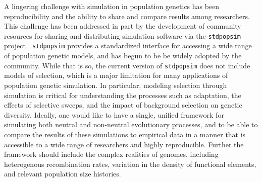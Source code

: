 \documentclass[hidelinks]{article}
\newcommand{\stdpopsim}{\texttt{stdpopsim}\xspace}
\begin{document}
    A lingering challenge with simulation in population genetics has been
    reproducibility and the ability to share and compare results among 
    researchers. This challenge has been addressed in part by the development
    of community resources for sharing and distributing simulation software
    via the \stdpopsim project \citep{adrion2020community}. \stdpopsim
    provides a standardized interface for accessing a wide range of
    population genetic models, and has begun to be be widely adopted by the community.
    While that is so, the current version of \stdpopsim does not include
    models of selection, which is a major limitation for many applications
    of population genetic simulation. In particular, modeling selection
    through simulation is critical for understanding the processes such
    as adaptation, the effects of selective sweeps, and the impact of
    background selection on genetic diversity. Ideally, one would like
    to have a single, unified framework for simulating both neutral and
    non-neutral evolutionary processes, and to be able to compare the
    results of these simulations to empirical data in a manner that is
    accessible to a wide range of researchers and highly reproducible. 
    Further the framework should include the complex realities of 
    genomes, including heterogenous recombination rates, 
    variation in the density of functional elements, and relevant
    population size histories. 
\end{document}
